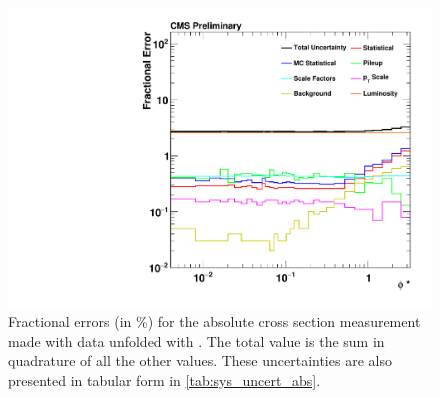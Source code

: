 \begin{figure}[!p]
    \centering
    \includegraphics[width=\textwidth]{figures/data_uncertainty_absolute.pdf}
    \caption[
        Fractional errors for the absolute cross section measurement
        made with data unfolded with \MADGRAPH.
    ]{
        Fractional errors (in \%) for the absolute cross section measurement
        made with data unfolded with \MADGRAPH. The total value is the sum in
        quadrature of all the other values. These uncertainties are also
        presented in tabular form in \cref{tab:sys_uncert_abs}.
    }
    \label{fig:sys_uncert_abs}
\end{figure}
